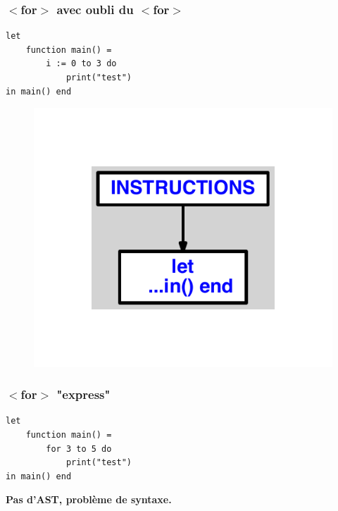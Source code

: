 \documentclass{article}
\begin{document}
\subsubsection{$ < $for$ > $ avec oubli du $ < $for$ > $}
\begin{lstlisting}
let
	function main() =
		i := 0 to 3 do
			print("test")
in main() end
\end{lstlisting}
\newpage
\begin{figure}[H]
\centering
\includegraphics[max width=\textwidth]{ast/ast_195.pdf}
\end{figure}
\newpage
\subsubsection{$ < $for$ > $ "express"}
\begin{lstlisting}
let
	function main() =
		for 3 to 5 do
			print("test")
in main() end
\end{lstlisting}
\newpage
{\color{red}\textbf{Pas d'AST, problème de syntaxe.}}
\newpage
\end{document}
